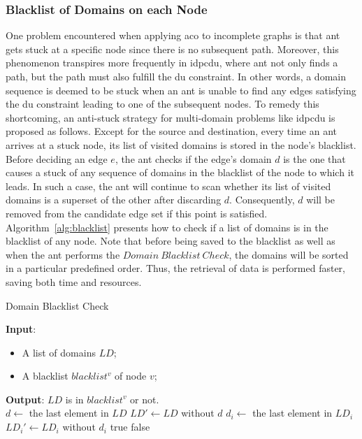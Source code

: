 \subsubsection{Blacklist of Domains on each Node}
One problem encountered when applying \gls{aco} to incomplete graphs is that ant gets stuck at a specific node since there is no subsequent path. Moreover, this phenomenon transpires more frequently in \gls{idpcdu}, where ant not only finds a path, but the path must also fulfill the \gls{du} constraint. In other words, a domain sequence is deemed to be stuck when an ant is unable to find any edges satisfying the \gls{du} constraint leading to one of the subsequent nodes. To remedy this shortcoming, an anti-stuck strategy for multi-domain problems like \gls{idpcdu} is proposed as follows. Except for the source and destination, every time an ant arrives at a stuck node, its list of visited domains is stored in the node's blacklist. Before deciding an edge $e$, the ant checks if the edge's domain $d$ is the one that causes a stuck of any sequence of domains in the blacklist of the node to which it leads. In such a case, the ant will continue to scan whether its list of visited domains is a superset of the other after discarding $d$. Consequently, $d$ will be removed from the candidate edge set if this point is satisfied. Algorithm~\ref{alg:blacklist} presents how to check if a list of domains is in the blacklist of any node. Note that before being saved to the blacklist as well as when the ant performs the $Domain~Blacklist~Check$, the domains will be sorted in a particular predefined order. Thus, the retrieval of data is performed faster, saving both time and resources.

\begin{algorithm}
	\caption{Domain Blacklist Check}
	\label{alg:blacklist}
	\textbf{Input}:	
	\begin{itemize}
		\item A list of domains $LD$;\\
		\item A blacklist $blacklist^v$ of node $v$;\\
	\end{itemize}
	\textbf{Output}: $LD$ is in $blacklist^v$ or not.\\
	\Begin
	{	
		$d \leftarrow $ the last element in $LD$\;
		$LD' \leftarrow LD$ without $d$\;		
		{
			$d_i \leftarrow $ the last element in $LD_i$\;
			{
				$LD_i' \leftarrow LD_i$ without $d_i$\;
				 {\Return true\;}
			}
		}
		\Return false\;
	}
\end{algorithm}

